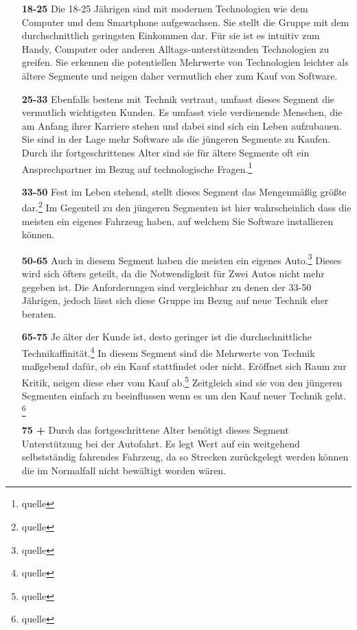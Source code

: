 \begin{itemize}
	\item[\textbf{18-25}] 
	Die 18-25 Jährigen sind mit modernen Technologien wie dem Computer und dem Smartphone aufgewachsen. Sie stellt die Gruppe mit dem durchschnittlich geringsten Einkommen dar. Für sie ist es intuitiv zum Handy, Computer oder anderen Alltags-unterstützenden Technologien zu greifen. Sie erkennen die potentiellen Mehrwerte von Technologien leichter als ältere Segmente und neigen daher vermutlich eher zum Kauf von Software. 
	
	\item[\textbf{25-33}]
	Ebenfalls bestens mit Technik vertraut, umfasst dieses Segment die vermutlich wichtigsten Kunden. Es umfasst viele verdienende Menschen, die am Anfang ihrer Karriere stehen und dabei sind sich ein Leben aufzubauen. Sie sind in der Lage mehr Software als die jüngeren Segmente zu Kaufen. Durch ihr fortgeschrittenes Alter sind sie für ältere Segmente oft ein Ansprechpartner im Bezug auf technologische Fragen.\footnote{quelle}
		
	\item[\textbf{33-50}]
	Fest im Leben stehend, stellt dieses Segment das Mengenmäßig größte dar.\footnote{quelle} Im Gegenteil zu den jüngeren Segmenten ist hier wahrscheinlich dass die meisten ein eigenes Fahrzeug haben, auf welchem Sie Software installieren können. 
	
	\item[\textbf{50-65}]
	Auch in diesem Segment haben die meisten ein eigenes Auto.\footnote{quelle} Dieses wird sich öfters geteilt, da die Notwendigkeit für Zwei Autos nicht mehr gegeben ist. Die Anforderungen sind vergleichbar zu denen der 33-50 Jährigen, jedoch lässt sich diese Gruppe im Bezug auf neue Technik eher beraten.
	
	\item[\textbf{65-75}]
	Je älter der Kunde ist, desto geringer ist die durchschnittliche Technikaffinität.\footnote{quelle} In diesem Segment sind die Mehrwerte von Technik maßgebend dafür, ob ein Kauf stattfindet oder nicht. Eröffnet sich Raum zur Kritik, neigen diese eher vom Kauf ab.\footnote{quelle} Zeitgleich sind sie von den jüngeren Segmenten einfach zu beeinflussen wenn es um den Kauf neuer Technik geht. \footnote{quelle}
	
	\item[\textbf{75 +}]
	Durch das fortgeschrittene Alter benötigt dieses Segment Unterstützung bei der Autofahrt. Es legt Wert auf ein weitgehend selbstständig fahrendes Fahrzeug, da so Strecken zurückgelegt werden können die im Normalfall nicht bewältigt worden wären. 
\end{itemize}

